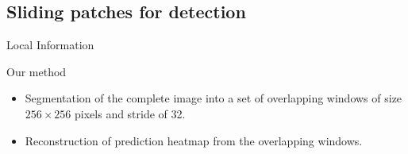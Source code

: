 \subsection{Sliding patches for detection}
\begin{frame}{Local Information}
    
\end{frame}

\begin{frame}{Our method}
    \begin{itemize}
        \item Segmentation of the complete image into a set of overlapping windows of size $256 \times 256$ pixels and stride of \SI{32}{\pixel}.
        \item Reconstruction of prediction heatmap from the overlapping windows.
    \end{itemize}
\end{frame}

